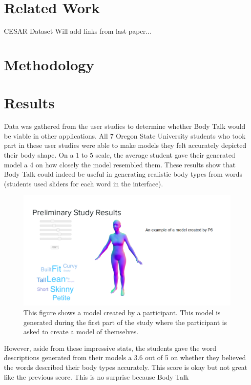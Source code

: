 \documentclass[journal]{vgtc}                %
\begin{document}
\section{Related Work}
CESAR Dataset
Will add links from last paper...
\section{Methodology}

\section{Results}

\noindent Data was gathered from the user studies to determine whether Body Talk would be viable in other applications. All 7 Oregon State University 
students who took part in these user studies were able to make models they felt accurately depicted their body shape. On a 1 to 5 scale, the average 
student gave their generated model a 4 on how closely the model resembled them. These results show that Body Talk could indeed be useful in generating 
realistic body types from words (students used sliders for each word in the interface). \newline
\begin{figure}[!htb]
	\includegraphics[width=\columnwidth]{user_self_creation.png}
	\caption{This figure shows a model created by a participant. This model is generated during the first part of the study where the participant is asked to create a model of themselves.}
\end{figure}
\noindent However, aside from these impressive stats, the students gave the word descriptions generated from their models a 3.6 out of 5 on whether  they 
believed the words described their body types accurately. This score is okay but not great like the previous score. This is no surprise because Body Talk 
\end{document}
